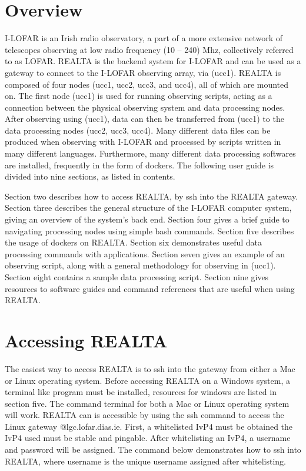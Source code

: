 \documentclass[11pt,fleqn]{book} %
\begin{document}



\section{Overview}



I-LOFAR is an Irish radio observatory, a part of a more extensive network of telescopes observing at low radio frequency (10 – 240) Mhz, collectively referred to as LOFAR. REALTA is the backend system for I-LOFAR and can be used as a gateway to connect to the I-LOFAR observing array, via (ucc1). REALTA is composed of four nodes (ucc1, ucc2, ucc3, and ucc4), all of which are mounted on. The first node (ucc1) is used for running observing scripts, acting as a connection between the physical observing system and data processing nodes. After observing using (ucc1), data can then be transferred from (ucc1) to the data processing nodes (ucc2, ucc3, ucc4). Many different data files can be produced when observing with I-LOFAR and processed by scripts written in many different languages. Furthermore, many different data processing softwares are installed, frequently in the form of dockers.
The following user guide is divided into nine sections, as listed in contents. 

Section two describes how to access REALTA, by ssh into the REALTA gateway. Section three describes the general structure of the I-LOFAR computer system, giving an overview of the system's back end. Section four gives a brief guide to navigating processing nodes using simple bash commands. Section five describes the usage of dockers on REALTA. Section six demonstrates useful data processing commands with applications. Section seven gives an example of an observing script, along with a general methodology for observing in (ucc1). Section eight contains a sample data processing script. Section nine gives resources to software guides and command references that are useful when using REALTA.

\section{Accessing REALTA}
The easiest way to access REALTA is to ssh into the gateway from either a Mac or Linux operating system. Before accessing REALTA on a Windows system, a terminal like program must be installed, resources for windows are listed in section five. The command terminal for both a Mac or Linux operating system will work. REALTA can is accessible by using the ssh command to access the Linux gateway @lgc.lofar.dias.ie. First, a whitelisted IvP4 must be obtained the IvP4 used must be stable and pingable. After whitelisting an IvP4, a username and password will be assigned.  The command below demonstrates how to ssh into REALTA, where username is the unique username assigned after whitelisting.
\end{document}
